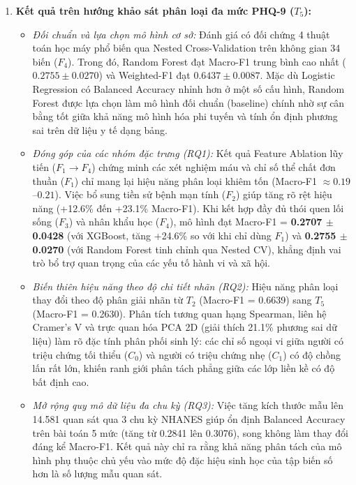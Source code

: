 \begin{enumerate}
    \item \textbf{Kết quả trên hướng khảo sát phân loại đa mức PHQ-9 ($T_5$):}
    \begin{itemize}
        \item \textit{Đối chuẩn và lựa chọn mô hình cơ sở:} Đánh giá có đối chứng 4 thuật toán học máy phổ biến qua Nested Cross-Validation trên không gian 34 biến ($F_4$). Trong đó, Random Forest đạt Macro-F1 trung bình cao nhất ($0.2755 \pm 0.0270$) và Weighted-F1 đạt $0.6437 \pm 0.0087$. Mặc dù Logistic Regression có Balanced Accuracy nhỉnh hơn ở một số cấu hình, Random Forest được lựa chọn làm mô hình đối chuẩn (baseline) chính nhờ sự cân bằng tốt giữa khả năng mô hình hóa phi tuyến và tính ổn định phương sai trên dữ liệu y tế dạng bảng.
        \item \textit{Đóng góp của các nhóm đặc trưng (RQ1):} Kết quả Feature Ablation lũy tiến ($F_1 \to F_4$) chứng minh các xét nghiệm máu và chỉ số thể chất đơn thuần ($F_1$) chỉ mang lại hiệu năng phân loại khiêm tốn (Macro-F1 $\approx 0.19$--$0.21$). Việc bổ sung tiền sử bệnh mạn tính ($F_2$) giúp tăng rõ rệt hiệu năng (+12.6\% đến +23.1\% Macro-F1). Khi kết hợp đầy đủ thói quen lối sống ($F_3$) và nhân khẩu học ($F_4$), mô hình đạt Macro-F1 = \textbf{0.2707 $\pm$ 0.0428} (với XGBoost, tăng +24.6\% so với khi chỉ dùng $F_1$) và \textbf{0.2755 $\pm$ 0.0270} (với Random Forest tinh chỉnh qua Nested CV), khẳng định vai trò bổ trợ quan trọng của các yếu tố hành vi và xã hội.
        \item \textit{Biến thiên hiệu năng theo độ chi tiết nhãn (RQ2):} Hiệu năng phân loại thay đổi theo độ phân giải nhãn từ $T_2$ (Macro-F1 = 0.6639) sang $T_5$ (Macro-F1 = 0.2630). Phân tích tương quan hạng Spearman, liên hệ Cramer's V và trực quan hóa PCA 2D (giải thích 21.1\% phương sai dữ liệu) làm rõ đặc tính phân phối sinh lý: các chỉ số ngoại vi giữa người có triệu chứng tối thiểu ($C_0$) và người có triệu chứng nhẹ ($C_1$) có độ chồng lấn rất lớn, khiến ranh giới phân tách phẳng giữa các lớp liền kề có độ bất định cao.
        \item \textit{Mở rộng quy mô dữ liệu đa chu kỳ (RQ3):} Việc tăng kích thước mẫu lên 14.581 quan sát qua 3 chu kỳ NHANES giúp ổn định Balanced Accuracy trên bài toán 5 mức (tăng từ 0.2841 lên 0.3076), song không làm thay đổi đáng kể Macro-F1. Kết quả này chỉ ra rằng khả năng phân tách của mô hình phụ thuộc chủ yếu vào mức độ đặc hiệu sinh học của tập biến số hơn là số lượng mẫu quan sát.
    \end{itemize}


\end{enumerate}
